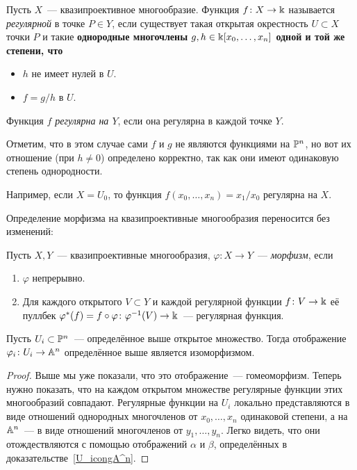 
	\begin{definition} 
		Пусть $X$~--- квазипроективное многообразие. Функция $f \colon X \to \bk$ называется \emph{регулярной} в точке $P \in Y$, если существует такая открытая окрестность $U \subset X$ точки $P$ и такие \bf{однородные} многочлены $g, h \in \bk[x_0, \ldots, x_n]$ \bf{одной и той же степени}, что 

		\begin{itemize}
			\item $h$ не имеет нулей в $U$.
			\item $f = g/h$ в $U$.
		\end{itemize}

		Функция \emph{$f$ регулярна на $Y$}, если она регулярна в каждой точке $Y$.
	\end{definition}

	\begin{remark}
		Отметим, что в этом случае сами $f$ и $g$ не являются функциями на $\PP^n$, но вот их отношение (при $h \neq 0$) определено корректно, так как они имеют одинаковую степень однородности. 
	\end{remark}

	\begin{example}
		Например, если $X = U_0$, то функция $f(x_0, \ldots, x_n) = x_1/x_0$ регулярна на $X$.  
	\end{example}

	Определение морфизма на квазипроективные многообразия переносится без изменений: 

	\begin{definition}\label{morphism_2} 
		Пусть $X, Y$~--- квазипроективные многообразия, $\varphi\colon X \to Y$~--- \emph{морфизм}, если
		\begin{enumerate}
			\item $\varphi$ непрерывно. 
			\item Для каждого открытого $V \subset Y$ и каждой регулярной функции $f\colon V \to \bk$ её пуллбек $\varphi^*(f) = f \circ \varphi\colon \varphi^{-1}(V) \to \bk$~--- регулярная функция. 
		\end{enumerate}
	\end{definition}

	\begin{statement} 
		Пусть $U_i \subset \PP^n$~--- определённое выше открытое множество. Тогда отображение $\varphi_i\colon U_i \to \AA^n$ определённое выше является изоморфизмом.  
	\end{statement}

	\begin{proof}
		Выше мы уже показали, что это отображение~--- гомеоморфизм. Теперь нужно показать, что на каждом открытом множестве регулярные функции этих многообразий совпадают. Регулярные функции на $U_i$ локально представляются в виде отношений однородных многочленов от $x_0, \ldots, x_n$ одинаковой степени, а на $\AA^n$~--- в виде отношений многочленов от $y_1, \ldots, y_n$. Легко видеть, что они отождествляются с помощью отображений $\alpha$ и $\beta$, определённых в доказательстве~\ref{U_icongA^n}. 
	\end{proof}

